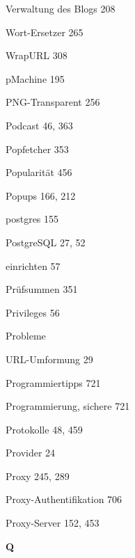 \documentclass{book}
\renewcommand\indexspace{\vspace{11pt}}
\renewcommand\subitem{\par}
\begin{document}
\begin{multicols}{2}
\begin{osp-index}
    \subitem Verwaltung des Blogs\hspace{1mm} 208
    \subitem Wort-Ersetzer\hspace{1mm} 265
    \subitem WrapURL\hspace{1mm} 308
  \item pMachine\hspace{1mm} 195
  \item PNG-Transparent\hspace{1mm} 256
  \item Podcast\hspace{1mm} 46, 363
  \item Popfetcher\hspace{1mm} 353
  \item Popularit\"at\hspace{1mm} 456
  \item Popups\hspace{1mm} 166, 212
  \item postgres\hspace{1mm} 155
  \item PostgreSQL\hspace{1mm} 27, 52
    \subitem einrichten\hspace{1mm} 57
  \item Pr\"ufsummen\hspace{1mm} 351
  \item Privileges\hspace{1mm} 56
  \item Probleme
    \subitem URL-Umformung\hspace{1mm} 29
  \item Programmiertipps\hspace{1mm} 721
  \item Programmierung, sichere\hspace{1mm} 721
  \item Protokolle\hspace{1mm} 48, 459
  \item Provider\hspace{1mm} 24
  \item Proxy\hspace{1mm} 245, 289
  \item Proxy-Authentifikation\hspace{1mm} 706
  \item Proxy-Server\hspace{1mm} 152, 453

  \indexspace
{\sffamily\bfseries Q}\nopagebreak


\end{osp-index}
\end{multicols}
\end{document}
